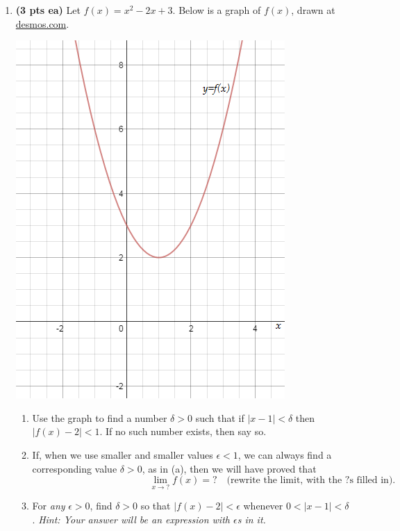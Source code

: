 \documentclass[12pt]{article}
\begin{document}
\begin{enumerate}
\newpage
\item {\bf (3 pts ea)} Let $f(x)=x^2-2x+3$.  Below is a graph of $f(x)$, drawn at \url{desmos.com}.
\begin{center}
\includegraphics[scale=0.4]{exam1Parabola}
\end{center}
\begin{enumerate}
	\item Use the graph to find a number $\delta>0$ such that if $|x-1|<\delta$ then $|f(x)-2|<1$.  If no such number exists, then say so.
	\vspace{4pc}
	
	\item If, when we use smaller and smaller values $\epsilon<1$, we can always find a corresponding value $\delta>0$, as in (a), then we will have proved that 
	\[
	\qquad\qquad\qquad\qquad\qquad\qquad\lim_{x\to ?}f(x)=? \quad\text{(rewrite the limit, with the ?s filled in).}
	\]
	\vspace{2pc}
	\item For \textit{any} $\epsilon>0$, find $\delta>0$ so that $|f(x)-2|<\epsilon$ whenever $0<|x-1|<\delta$.  \textit{Hint: Your answer will be an expression with $\epsilon$s in it.} 
	\end{enumerate}  


\end{enumerate}
\end{document}

